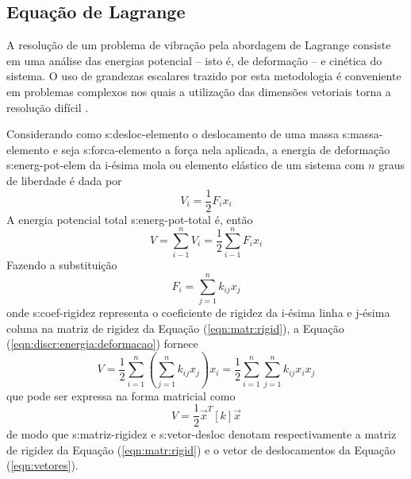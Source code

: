 \documentclass[12pt,openright,oneside,a4paper,
	chapter=TITLE,section=TITLE,
	english,brazil]{abntex2}
\begin{document}
	\subsection{Equação de Lagrange}
	A resolução de um problema de vibração pela abordagem de Lagrange consiste em uma análise das energias potencial -- isto é, de deformação -- e cinética do sistema. O uso de grandezas escalares trazido por esta metodologia é conveniente em problemas complexos nos quais a utilização das dimensões vetoriais torna a resolução difícil \cite{savi:2017}.
	
	Considerando como \gls{s:desloc-elemento} o deslocamento de uma massa \gls{s:massa-elemento} e seja \gls{s:forca-elemento} a força nela aplicada, a energia de deformação \gls{s:energ-pot-elem} da i-ésima mola ou elemento elástico de um sistema com $ n $ graus de liberdade é dada por \cite{rao:2008}
	\begin{equation}
		V_i = \frac{1}{2}F_i x_i
	\end{equation}
	A energia potencial total \gls{s:energ-pot-total} é, então
	\begin{equation} \label{eqn:discr:energia:deformacao}
		V = \sum_{i-1}^{n}V_i = \frac{1}{2}\sum_{i-1}^{n}F_i x_i
	\end{equation}
	Fazendo a substituição
	\begin{equation}
		F_i = \sum_{j=1}^{n}k_{ij} x_j
	\end{equation}
	onde \gls{s:coef-rigidez} representa o coeficiente de rigidez da i-ésima linha e j-ésima coluna na matriz de rigidez da Equação (\ref{eqn:matr:rigid}), a Equação (\ref{eqn:discr:energia:deformacao}) fornece
	\begin{equation}
		V = \frac{1}{2}\sum_{i=1}^{n}\left(\sum_{j=1}^{n}k_{ij} x_j\right)x_i = \frac{1}{2}\sum_{i=1}^{n}\sum_{j=1}^{n}k_{ij} x_i x_j
	\end{equation}
	que pode ser expressa na forma matricial como
	\begin{equation}
		V = \frac{1}{2}\vec{x}^T [k] \vec{x}
	\end{equation}
	de modo que \gls{s:matriz-rigidez} e \gls{s:vetor-desloc} denotam respectivamente a matriz de rigidez da Equação (\ref{eqn:matr:rigid}) e o vetor de deslocamentos da Equação (\ref{eqn:vetores}).
	
\end{document}
